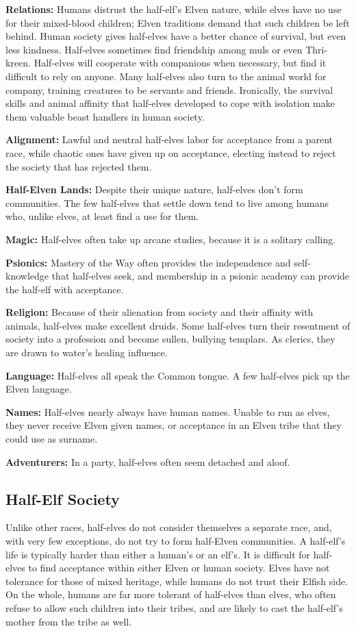 \textbf{Relations:} Humans distrust the half-elf's Elven nature, while elves have no use for their mixed-blood children; Elven traditions demand that such children be left behind. Human society gives half-elves have a better chance of survival, but even less kindness. Half-elves sometimes find friendship among muls or even Thri-kreen. Half-elves will cooperate with companions when necessary, but find it difficult to rely on anyone. Many half-elves also turn to the animal world for company, training creatures to be servants and friends. Ironically, the survival skills and animal affinity that half-elves developed to cope with isolation make them valuable beast handlers in human society.

\textbf{Alignment:} Lawful and neutral half-elves labor for acceptance from a parent race, while chaotic ones have given up on acceptance, electing instead to reject the society that has rejected them.

\textbf{Half-Elven Lands:} Despite their unique nature, half-elves don't form communities. The few half-elves that settle down tend to live among humans who, unlike elves, at least find a use for them.

\textbf{Magic:} Half-elves often take up arcane studies, because it is a solitary calling.

\textbf{Psionics:} Mastery of the Way often provides the independence and self-knowledge that half-elves seek, and membership in a psionic academy can provide the half-elf with acceptance.

\textbf{Religion:} Because of their alienation from society and their affinity with animals, half-elves make excellent druids. Some half-elves turn their resentment of society into a profession and become sullen, bullying templars. As clerics, they are drawn to water's healing influence.

\textbf{Language:} Half-elves all speak the Common tongue. A few half-elves pick up the Elven language.

\textbf{Names:} Half-elves nearly always have human names. Unable to run as elves, they never receive Elven given names, or acceptance in an Elven tribe that they could use as surname.

\textbf{Adventurers:} In a party, half-elves often seem detached and aloof.

\subsection{Half-Elf Society}
Unlike other races, half-elves do not consider themselves a separate race, and, with very few exceptions, do not try to form half-Elven communities. A half-elf's life is typically harder than either a human's or an elf's. It is difficult for half-elves to find acceptance within either Elven or human society. Elves have not tolerance for those of mixed heritage, while humans do not trust their Elfish side. On the whole, humans are far more tolerant of half-elves than elves, who often refuse to allow such children into their tribes, and are likely to cast the half-elf's mother from the tribe as well.

